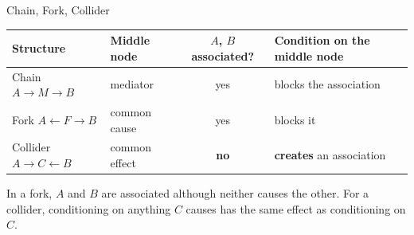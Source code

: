 \documentclass[aspectratio=169, 11pt, handout]{beamer}
\begin{document}
\begin{frame}{Chain, Fork, Collider}

\begin{center}
\end{center}

\medskip

\begin{center}
\small
\begin{tabular}{llcl}
\toprule
\textbf{Structure} & \textbf{Middle node} & \textbf{$A$, $B$ associated?} & \textbf{Condition on the middle node} \\
\midrule
Chain $A \to M \to B$ & mediator & yes & blocks the association \\
Fork $A \leftarrow F \to B$ & common cause & yes & blocks it \\
Collider $A \to C \leftarrow B$ & common effect & \textbf{no} & \textcolor{warnred}{\textbf{creates} an association} \\
\bottomrule
\end{tabular}
\end{center}

\medskip

In a fork, $A$ and $B$ are associated although neither causes the other. For a collider, conditioning on anything $C$ causes has the same effect as conditioning on $C$.
\end{frame}
\end{document}
